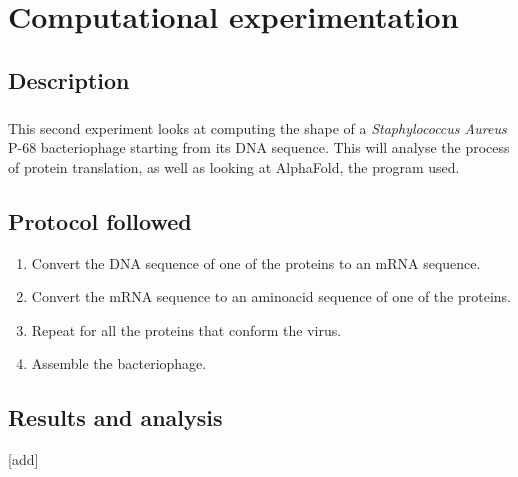 \chapter{Computational experimentation}
\section{Description}
\paragraph{}This second experiment looks at computing the shape of a \emph{Staphylococcus Aureus} P-68 bacteriophage starting from its DNA sequence. This will analyse the process of protein translation, as well as looking at AlphaFold, the program used.
\section{Protocol followed}
\begin{enumerate}[label=\arabic*)]
\item Convert the DNA sequence of one of the proteins to an mRNA sequence.
\item Convert the mRNA sequence to an aminoacid sequence of one of the proteins.
\item Repeat for all the proteins that conform the virus.
\item Assemble the bacteriophage.
\end{enumerate}
\section{Results and analysis}
[add]